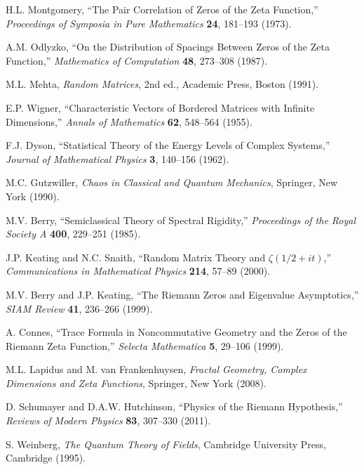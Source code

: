 \documentclass[11pt]{article}
\theoremstyle{plain}
\theoremstyle{definition}
\theoremstyle{remark}
\begin{document}
\begin{thebibliography}{99}
 H.L. Montgomery, ``The Pair Correlation of Zeros of the Zeta Function,'' \emph{Proceedings of Symposia in Pure Mathematics} \textbf{24}, 181--193 (1973).

 A.M. Odlyzko, ``On the Distribution of Spacings Between Zeros of the Zeta Function,'' \emph{Mathematics of Computation} \textbf{48}, 273--308 (1987).

 M.L. Mehta, \emph{Random Matrices}, 2nd ed., Academic Press, Boston (1991).

 E.P. Wigner, ``Characteristic Vectors of Bordered Matrices with Infinite Dimensions,'' \emph{Annals of Mathematics} \textbf{62}, 548--564 (1955).

 F.J. Dyson, ``Statistical Theory of the Energy Levels of Complex Systems,'' \emph{Journal of Mathematical Physics} \textbf{3}, 140--156 (1962).

 M.C. Gutzwiller, \emph{Chaos in Classical and Quantum Mechanics}, Springer, New York (1990).

 M.V. Berry, ``Semiclassical Theory of Spectral Rigidity,'' \emph{Proceedings of the Royal Society A} \textbf{400}, 229--251 (1985).

 J.P. Keating and N.C. Snaith, ``Random Matrix Theory and $\zeta(1/2+it)$,'' \emph{Communications in Mathematical Physics} \textbf{214}, 57--89 (2000).

 M.V. Berry and J.P. Keating, ``The Riemann Zeros and Eigenvalue Asymptotics,'' \emph{SIAM Review} \textbf{41}, 236--266 (1999).

 A. Connes, ``Trace Formula in Noncommutative Geometry and the Zeros of the Riemann Zeta Function,'' \emph{Selecta Mathematica} \textbf{5}, 29--106 (1999).

 M.L. Lapidus and M. van Frankenhuysen, \emph{Fractal Geometry, Complex Dimensions and Zeta Functions}, Springer, New York (2008).

 D. Schumayer and D.A.W. Hutchinson, ``Physics of the Riemann Hypothesis,'' \emph{Reviews of Modern Physics} \textbf{83}, 307--330 (2011).

 S. Weinberg, \emph{The Quantum Theory of Fields}, Cambridge University Press, Cambridge (1995).


\end{thebibliography}
\end{document}
